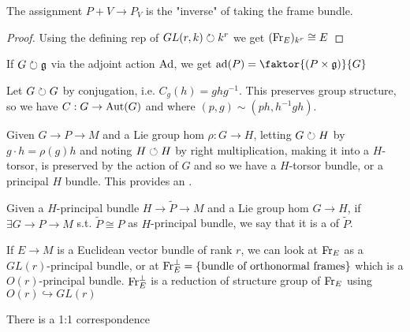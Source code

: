 \documentclass{article}
\begin{document}
\begin{prop}
The assignment $P+V \to P_V$ is the "inverse" of taking the frame bundle.  
\end{prop}
\begin{proof}
Using the defining rep of $GL(r,k) \circlearrowright k^r$ we get $(\operatorname{Fr}_E)_{k^r} \cong E$
\end{proof}

\begin{example}
If $G \circlearrowright \mathfrak{g}$ via the adjoint action $\operatorname{Ad}$, we get $\ad(P) = \faktor{(P \times \mf{g})}{G}$
\end{example}

\begin{example}
Let $G \circlearrowright G$ by conjugation, i.e. $C_g(h) = ghg^{-1}$. This preserves group structure, so we have $C : G \to \operatorname{Aut}(G)$ and 
where $(p,g) \sim (ph,h^{-1}gh)$.
\end{example}

\begin{definition}
	Given $G \to P \to M$ and a Lie group hom $\rho : G \to H$, letting $G \circlearrowright H$ by $g \cdot h = \rho(g)h$ and noting $H \circlearrowleft H$ by right multiplication, making it into a $H$-torsor, is preserved by the action of $G$ and so we have  
	a $H$-torsor bundle, or a principal $H$ bundle. This provides an .
\end{definition}

\begin{definition}
Given a $H$-principal bundle $H \to \tilde{P} \to M$ and a Lie group hom $G \to H$, if $\exists G \to P \to M$ s.t.  $\tilde{P} \cong P$ as $H$-principal bundle, we say that it is a  of $\tilde{P}$.
\end{definition}

\begin{example}
If $E \to M$ is a Euclidean vector bundle of rank $r$, we can look at $\operatorname{Fr}_E$ as a $GL(r)$-principal bundle, or at $\operatorname{Fr}_E^\perp= \left\{ \text{bundle of orthonormal frames} \right\}$ which is a $O(r)$-principal bundle. $\operatorname{Fr}_E^\perp$ is a reduction of structure group of $\operatorname{Fr}_E$ using $O(r) \hookrightarrow GL(r)$
\end{example}


\begin{prop}
There is a 1:1 correspondence 
\end{prop}
\end{document}
